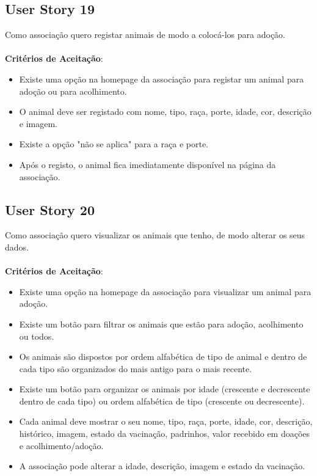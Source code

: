 \documentclass[a4paper,11pt]{article}
\begin{document}
\subsection*{User Story 19}
Como associação quero registar animais de modo a colocá-los para adoção.\\\\
\textbf{Critérios de Aceitação}:
\begin{itemize}
  \item Existe uma opção na homepage da associação para registar um animal para adoção ou para acolhimento.
  \item O animal deve ser registado com nome, tipo, raça, porte, idade, cor, descrição e imagem.
  \item Existe a opção "não se aplica" para a raça e porte.
  \item Após o registo, o animal fica imediatamente disponível na página da associação.
\end{itemize}

\subsection*{User Story 20}
Como associação quero visualizar os animais que tenho, de modo alterar os seus dados.\\\\
\textbf{Critérios de Aceitação}:
\begin{itemize}
  \item Existe uma opção na homepage da associação para visualizar um animal para adoção.
  \item Existe um botão para filtrar os animais que estão para adoção, acolhimento ou todos.
  \item Os animais são dispostos por ordem alfabética de tipo de animal e dentro de cada tipo são organizados do mais antigo para o mais recente.
  \item Existe um botão para organizar os animais por idade (crescente e decrescente dentro de cada tipo) ou ordem alfabética de tipo (crescente ou decrescente).
  \item Cada animal deve mostrar o seu nome, tipo, raça, porte, idade, cor, descrição, histórico, imagem, estado da vacinação, padrinhos, valor recebido em doações e acolhimento/adoção.
  \item A associação pode alterar a idade, descrição, imagem e estado da vacinação.
\end{itemize}
\end{document}
